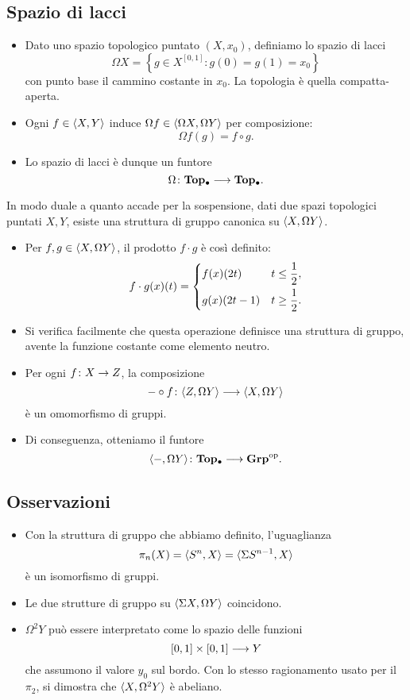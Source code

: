 \subsection*{Spazio di lacci}
\begin{frame*}
\begin{itemize}
\item Dato uno spazio topologico puntato $(X,x_0)$, definiamo lo spazio di lacci
\[
\Omega X=\left\{g\in X^{[0,1]}:g(0)=g(1)=x_0\right\}
\]
con punto base il cammino costante in $x_0$. La topologia è quella compatta-aperta.
\item Ogni $f\in\langle X,Y\rangle$ induce $\Omega f\in\langle \Omega X,\Omega Y\rangle$ per composizione:
\[
\Omega f(g)=f\circ g.
\]
 \item Lo spazio di lacci è dunque un funtore
\[
\map{\Omega}{\Top0}{\Top0}.
\]
\end{itemize}
\end{frame*}

\begin{frame*}
In modo duale a quanto accade per la sospensione, dati due spazi topologici puntati $X,Y$, esiste una struttura di gruppo canonica su $\langle X,\Omega Y\rangle$.
\begin{itemize}
\item Per $f,g\in\langle X,\Omega Y\rangle$, il prodotto $f\cdot g$ è così definito:
\[
f\cdot g(x)(t)=\begin{dcases}f(x)(2t)&t\le\frac{1}{2},\\g(x)(2t-1)&t\ge\frac{1}{2}.\end{dcases}
\]
\item Si verifica facilmente che questa operazione definisce una struttura di gruppo, avente la funzione costante come elemento neutro.
\item Per ogni $\map{f}{X}{Z}$, la composizione
\[
\map{-\circ f}{\hmaps{Z,\Omega Y}}{\hmaps{X,\Omega Y}}
\]
 è un omomorfismo di gruppi.
 \item Di conseguenza, otteniamo il funtore
 \[
 \map{\hmaps{-,\Omega Y}}{\Top0}{\Grp^{\text{op}}}.
 \]
\end{itemize}
\end{frame*}

\subsection*{Osservazioni}
\begin{frame*}
\begin{itemize}
\item Con la struttura di gruppo che abbiamo definito, l'uguaglianza
\[
\pi_n(X)=\langle S^n,X\rangle=\langle \Sigma S^{n-1},X\rangle
\]
è un isomorfismo di gruppi.
\item Le due strutture di gruppo su  $\langle \Sigma X,\Omega Y\rangle$ coincidono.
\item $\Omega^2Y$ può essere interpretato come lo spazio delle funzioni
\[
\umap{[0,1]\times[0,1]}{Y}
\]
che assumono il valore $y_0$ sul bordo. Con lo stesso ragionamento usato per il $\pi_2$, si dimostra che $\langle X,\Omega^2Y\rangle$ è abeliano.
\end{itemize}
\end{frame*}

